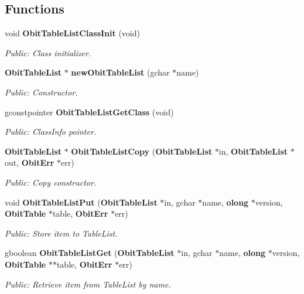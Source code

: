 \subsection*{Functions}
\begin{CompactItemize}
\item 
void {\bf Obit\-Table\-List\-Class\-Init} (void)
\begin{CompactList}\small\item\em Public: Class initializer. \item\end{CompactList}\item 
{\bf Obit\-Table\-List} $\ast$ {\bf new\-Obit\-Table\-List} (gchar $\ast$name)
\begin{CompactList}\small\item\em Public: Constructor. \item\end{CompactList}\item 
gconstpointer {\bf Obit\-Table\-List\-Get\-Class} (void)
\begin{CompactList}\small\item\em Public: Class\-Info pointer. \item\end{CompactList}\item 
{\bf Obit\-Table\-List} $\ast$ {\bf Obit\-Table\-List\-Copy} ({\bf Obit\-Table\-List} $\ast$in, {\bf Obit\-Table\-List} $\ast$out, {\bf Obit\-Err} $\ast$err)
\begin{CompactList}\small\item\em Public: Copy constructor. \item\end{CompactList}\item 
void {\bf Obit\-Table\-List\-Put} ({\bf Obit\-Table\-List} $\ast$in, gchar $\ast$name, {\bf olong} $\ast$version, {\bf Obit\-Table} $\ast$table, {\bf Obit\-Err} $\ast$err)
\begin{CompactList}\small\item\em Public: Store item to Table\-List. \item\end{CompactList}\item 
gboolean {\bf Obit\-Table\-List\-Get} ({\bf Obit\-Table\-List} $\ast$in, gchar $\ast$name, {\bf olong} $\ast$version, {\bf Obit\-Table} $\ast$$\ast$table, {\bf Obit\-Err} $\ast$err)
\begin{CompactList}\small\item\em Public: Retrieve item from Table\-List by name. \item\end{CompactList}\item 
$$
\end{CompactItemize}
